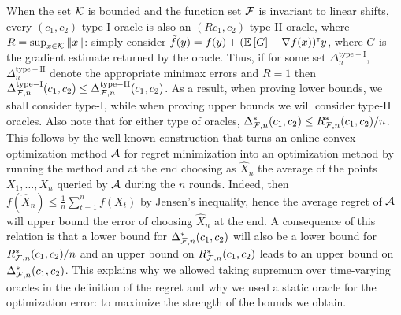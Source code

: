When the set $\mathcal{K}$ is bounded and the function set $\mathcal{F}$ is invariant to linear shifts, every $(c_1,c_2)$ type-I oracle is also an $(R c_1,c_2)$ type-II oracle,
where $R = \sup_{x\in \mathcal{K}} \|x\|$: simply consider $\tilde{f}(y) =  f(y) + (\mathbb{E}\left[G\right]-\nabla f(x))^\mathsf{\scriptscriptstyle T} y $,
where $G$ is the gradient estimate returned by the oracle. %
Thus, if for some set $\Delta_{n}^{\mathrm{type-I}}$, $\Delta_{n}^{\mathrm{type-II}}$
denote the appropriate minimax errors and $R=1$
then $\Delta_{\mathcal{F},n}^{\mathrm{type-I}}(c_1,c_2) \le \Delta_{\mathcal{F},n}^{\mathrm{type-II}}(c_1,c_2)  $.
As a result, when proving lower bounds, we shall consider type-I, while when proving upper bounds we will consider type-II oracles.
Also note that for either type of oracles, $\Delta_{\mathcal{F},n}^*(c_1,c_2) \le R_{\mathcal{F},n}^*(c_1,c_2)/n$. This follows by the well known construction that turns an online convex optimization method $\mathcal{A}$ for regret minimization into an optimization method by running the method and at the end choosing as $\hat{X}_n$ the average of the points $X_1,\dots,X_n$ queried by $\mathcal{A}$ during the $n$ rounds.
Indeed, then $f(\hat{X}_n) \le \frac1n \sum_{t=1}^n f(X_t)$ by Jensen's inequality, hence the average regret of $\mathcal{A}$ will upper bound the error of choosing $\hat{X}_n$ at the end.
A consequence of this relation is that a lower bound for $\Delta_{\mathcal{F},n}^*(c_1,c_2) $ will also be a lower bound for $R^*_{\mathcal{F},n}(c_1,c_2)/n$ and an upper bound on $R^*_{\mathcal{F},n}(c_1,c_2)$ leads to an upper bound on $\Delta_{\mathcal{F},n}^*(c_1,c_2)$. This explains why we allowed taking supremum over time-varying oracles in the definition of the regret and why we used a static oracle for the optimization error: to maximize the strength of the bounds we obtain.

